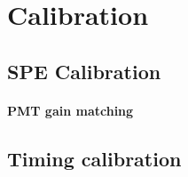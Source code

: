 \section{Calibration}

\subsection{SPE Calibration}
\paragraph{PMT gain matching}
\subsection{Timing calibration}

